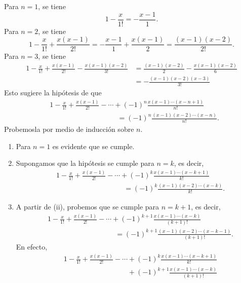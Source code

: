 \begin{examplebox}{}{}
    \tcblower
    \solucion Para $n = 1$, se tiene
    $$1 - \frac{x}{1!} = - \frac{x - 1}{1}.$$
    Para $n = 2$, se tiene
    $$1 - \frac{x}{1!} + \frac{x(x - 1)}{2!} = - \frac{x - 1}{1} + \frac{x(x - 1)}{2} = \frac{(x - 1)(x - 2)}{2!}.$$
    Para $n = 3$, se tiene
    \begin{align*}
        1 - \frac{x}{1!} + \frac{x(x - 1)}{2!} - \frac{x(x - 1)(x - 2)}{3!} & = \frac{(x - 1)(x - 2)}{2} - \frac{x(x - 1)(x - 2)}{6} \\
        & = - \frac{(x - 1)(x - 2)(x - 3)}{3!}
    \end{align*}
    Esto sugiere la hipótesis de que
    \begin{align*}
        & 1 - \frac{x}{1!} + \frac{x(x - 1)}{2!} - \cdots + (-1)^n \frac{x(x - 1) \cdots (x - n + 1)}{n!} \\
        & \hspace{4cm} = (-1)^n \frac{(x - 1)(x - 2) \cdots (x - n)}{n!}.
    \end{align*}
    Probemosla por medio de inducción sobre $n$.
    \begin{enumerate}[label=\roman*., topsep=6pt, itemsep=0pt]
        \item Para $n = 1$ es evidente que se cumple.
        \item Supongamos que la hipótesis se cumple para $n = k$, es decir,
        \begin{align*}
            & 1 - \frac{x}{1!} + \frac{x(x - 1)}{2!} - \cdots + (-1)^k \frac{x(x - 1) \cdots (x - k + 1)}{k!} \\
            & \hspace{4cm} = (-1)^k \frac{(x - 1)(x - 2) \cdots (x - k)}{k!}.
        \end{align*}
        \item A partir de (ii), probemos que se cumple para $n = k + 1$, es decir,
        \begin{align*}
            & 1 - \frac{x}{1!} + \frac{x(x - 1)}{2!} - \cdots + (-1)^{k + 1} \frac{x(x - 1) \cdots (x - k)}{(k + 1)!} \\
            & \hspace{4cm} = (-1)^{k + 1} \frac{(x - 1)(x - 2) \cdots (x - k - 1)}{(k + 1)!}.
        \end{align*}
        En efecto,
        \begin{align*}
            & 1 - \frac{x}{1!} + \frac{x(x - 1)}{2!} - \cdots + (-1)^k \frac{x(x - 1) \cdots (x - k + 1)}{k!} \\
            & \phantom{1 - \frac{x}{1!} + \frac{x(x - 1)}{2!} - \cdots} + (-1)^{k + 1} \frac{x(x - 1) \cdots (x - k)}{(k + 1)!} \\

\end{align*}
\end{enumerate}
\end{examplebox}
